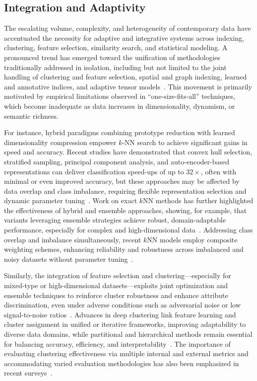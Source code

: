 \documentclass[sigconf]{acmart}
\begin{document}
\subsection{Integration and Adaptivity}

The escalating volume, complexity, and heterogeneity of contemporary data have accentuated the necessity for adaptive and integrative systems across indexing, clustering, feature selection, similarity search, and statistical modeling. A pronounced trend has emerged toward the unification of methodologies traditionally addressed in isolation, including but not limited to the joint handling of clustering and feature selection, spatial and graph indexing, learned and annotative indices, and adaptive tensor models~\cite{ref8, ref10, ref12, ref21, ref22, ref24, ref25, ref27, ref29, ref30}. This movement is primarily motivated by empirical limitations observed in ``one-size-fits-all'' techniques, which become inadequate as data increases in dimensionality, dynamism, or semantic richness.

For instance, hybrid paradigms combining prototype reduction with learned dimensionality compression empower $k$-NN search to achieve significant gains in speed and accuracy. Recent studies have demonstrated that convex hull selection, stratified sampling, principal component analysis, and auto-encoder-based representations can deliver classification speed-ups of up to $32\times$, often with minimal or even improved accuracy, but these approaches may be affected by data overlap and class imbalance, requiring flexible representation selection and dynamic parameter tuning~\cite{ref8, ref62, ref63, ref71, ref73, ref74}. Work on exact $k$NN methods has further highlighted the effectiveness of hybrid and ensemble approaches, showing, for example, that variants leveraging ensemble strategies achieve robust, domain-adaptable performance, especially for complex and high-dimensional data~\cite{ref71, ref73, ref74}. Addressing class overlap and imbalance simultaneously, recent $k$NN models employ composite weighting schemes, enhancing reliability and robustness across imbalanced and noisy datasets without parameter tuning~\cite{ref74}.

Similarly, the integration of feature selection and clustering---especially for mixed-type or high-dimensional datasets---exploits joint optimization and ensemble techniques to reinforce cluster robustness and enhance attribute discrimination, even under adverse conditions such as adversarial noise or low signal-to-noise ratios~\cite{ref39, ref67}. Advances in deep clustering link feature learning and cluster assignment in unified or iterative frameworks, improving adaptability to diverse data domains, while partitional and hierarchical methods remain essential for balancing accuracy, efficiency, and interpretability~\cite{ref22, ref67}. The importance of evaluating clustering effectiveness via multiple internal and external metrics and accommodating varied evaluation methodologies has also been emphasized in recent surveys~\cite{ref21, ref22, ref67}.
\end{document}

